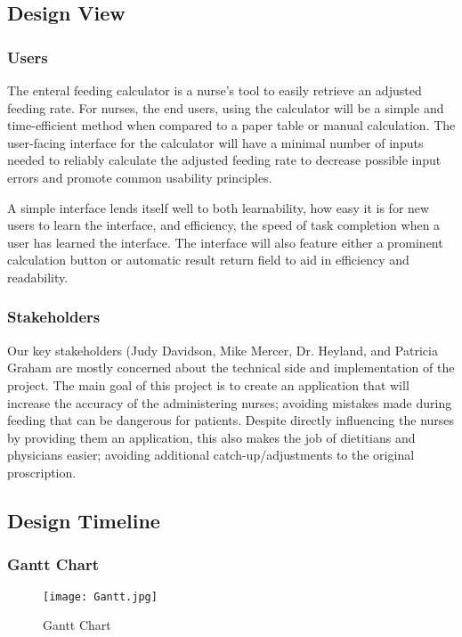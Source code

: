\documentclass[onecolumn, draftclsnofoot,10pt, compsoc]{IEEEtran}
\begin{document}
\subsection{Design View}
\subsubsection{Users}
The enteral feeding calculator is a nurse's tool to easily retrieve an adjusted feeding rate.
For nurses, the end users, using the calculator will be a simple and time-efficient method when compared to a paper table or manual calculation.
The user-facing interface for the calculator will have a minimal number of inputs needed to reliably calculate the adjusted feeding rate to decrease possible input errors and promote common usability principles.

A simple interface lends itself well to both learnability, how easy it is for new users to learn the interface, and efficiency, the speed of task completion when a user has learned the interface.
The interface will also feature either a prominent calculation button or automatic result return field to aid in efficiency and readability.
\subsubsection{Stakeholders}%
Our key stakeholders (Judy Davidson, Mike Mercer, Dr. Heyland, and Patricia Graham are mostly concerned about the technical side and implementation of the project. The main goal of this project is to create an application that will increase the accuracy of the administering nurses; avoiding mistakes made during feeding that can be dangerous for patients. Despite directly influencing the nurses by providing them an application, this also makes the job of dietitians and physicians easier; avoiding additional catch-up/adjustments to the original proscription. 
\subsection{Design Timeline}
\subsubsection{Gantt Chart}
\begin{figure}[h!]
\centering
\texttt{[image: Gantt.jpg]}
\centering
\caption{Gantt Chart}
\label{fig:gantt_chartl}
\end{figure}
\end{document}
